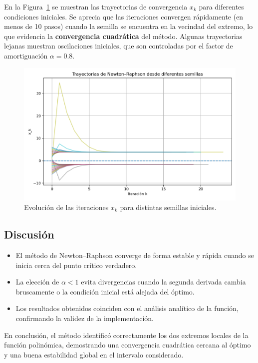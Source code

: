 \documentclass{article}
\begin{document}
En la Figura~\ref{fig:trayectorias} se muestran las trayectorias de convergencia
\(x_k\) para diferentes condiciones iniciales.  
Se aprecia que las iteraciones convergen rápidamente (en menos de 10 pasos)
cuando la semilla se encuentra en la vecindad del extremo, lo que evidencia la
\textbf{convergencia cuadrática} del método.  
Algunas trayectorias lejanas muestran oscilaciones iniciales,
que son controladas por el factor de amortiguación \(\alpha=0.8\).

\begin{figure}[H]
    \centering
    \includegraphics[width=0.8\linewidth]{problema1_trayectorias.png}
    \caption{Evolución de las iteraciones \(x_k\) para distintas semillas iniciales.}
    \label{fig:trayectorias}
\end{figure}

\subsection{Discusión}

\begin{itemize}
    \item El método de Newton--Raphson converge de forma estable y rápida
    cuando se inicia cerca del punto crítico verdadero.
    \item La elección de \(\alpha < 1\) evita divergencias cuando la segunda derivada
    cambia bruscamente o la condición inicial está alejada del óptimo.
    \item Los resultados obtenidos coinciden con el análisis analítico de la función,
    confirmando la validez de la implementación.
\end{itemize}

En conclusión, el método identificó correctamente los dos extremos locales de la
función polinómica, demostrando una convergencia cuadrática cercana al óptimo y
una buena estabilidad global en el intervalo considerado.
\end{document}
